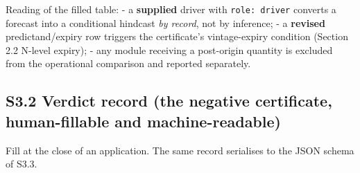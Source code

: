 \documentclass[11pt]{article}
\begin{document}
Reading of the filled table: - a \textbf{supplied} driver with
\texttt{role:\ driver} converts a forecast into a conditional hindcast
\emph{by record}, not by inference; - a \textbf{revised}
predictand/expiry row triggers the certificate's vintage-expiry
condition (Section 2.2 N-level expiry); - any module receiving a
post-origin quantity is excluded from the operational comparison and
reported separately.

\subsection{S3.2 Verdict record (the negative certificate,
human-fillable and
machine-readable)}\label{s3.2-verdict-record-the-negative-certificate-human-fillable-and-machine-readable}

Fill at the close of an application. The same record serialises to the
JSON schema of S3.3.
\end{document}

